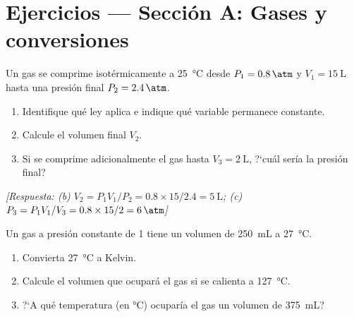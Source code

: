 
\section*{Ejercicios --- Secci\'on A: Gases y conversiones}
\label{sec:ejercicios_cap01a}

\begin{bloque_ejercicios}

\begin{ejercicios}

\item Un gas se comprime isot\'ermicamente a \SI{25}{\celsius} desde
$P_1 = \SI{0.8}{\atm}$ y $V_1 = \SI{15}{\liter}$ hasta una presi\'on
final $P_2 = \SI{2.4}{\atm}$.

\begin{enumerate}[label=\alph*)]
    \item Identifique qu\'e ley aplica e indique qu\'e variable
          permanece constante.
    \item Calcule el volumen final $V_2$.
    \item Si se comprime adicionalmente el gas hasta $V_3 = \SI{2}{\liter}$,
          ?`cu\'al ser\'ia la presi\'on final?
\end{enumerate}

\textit{[Respuesta: (b) $V_2 = P_1V_1/P_2 = 0.8\times15/2.4
= \SI{5}{\liter}$;
(c) $P_3 = P_1V_1/V_3 = 0.8\times15/2 = \SI{6}{\atm}$]}

\item Un gas a presi\'on constante de \SI{1}{\atm} tiene un volumen de
\SI{250}{\milli\liter} a \SI{27}{\celsius}.

\begin{enumerate}[label=\alph*)]
    \item Convierta \SI{27}{\celsius} a Kelvin.
    \item Calcule el volumen que ocupar\'a el gas si se calienta a
          \SI{127}{\celsius}.
    \item ?`A qu\'e temperatura (en \si{\celsius}) ocupar\'ia el gas
          un volumen de \SI{375}{\milli\liter}?
\end{enumerate}


\end{ejercicios}
\end{bloque_ejercicios}
